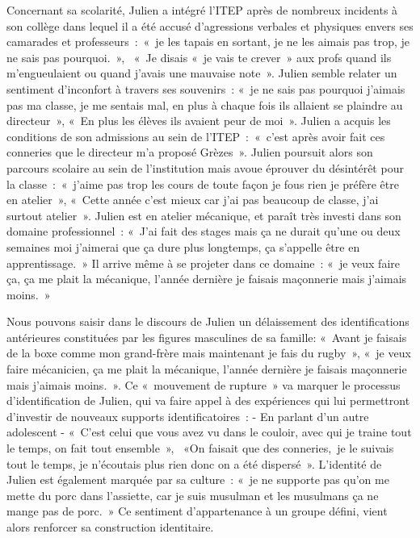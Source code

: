 \documentclass[12pt, a4paper]{book}
\begin{document}
\begin{spacing}{1.5}
Concernant sa scolarité, Julien a intégré l'ITEP après de nombreux incidents à son collège dans lequel il a été accusé d'agressions verbales et physiques envers ses camarades et professeurs : « je les tapais en sortant, je ne les aimais pas trop, je ne sais pas pourquoi. »,  « Je disais « je vais te crever » aux profs quand ils m'engueulaient ou quand j'avais une mauvaise note ». Julien semble relater un sentiment d'inconfort à travers ses souvenirs : « je ne sais pas pourquoi j'aimais pas ma classe, je me sentais mal, en plus à chaque fois ils allaient se plaindre au directeur », « En plus les élèves ils avaient peur de moi ». Julien a acquis les conditions de son admissions au sein de l'ITEP : « c'est après avoir fait ces conneries que le directeur m'a proposé Grèzes ». Julien poursuit alors son parcours scolaire au sein de l'institution mais avoue éprouver du désintérêt pour  la classe : « j'aime pas trop les cours de toute façon je fous rien je préfère être en atelier », « Cette année c'est mieux car j'ai pas beaucoup de classe, j'ai surtout atelier ». Julien est en atelier mécanique, et paraît très investi dans son domaine professionnel : « J'ai fait des stages mais ça ne durait qu'une ou deux semaines moi j'aimerai que ça dure plus longtemps, ça s'appelle être en apprentissage. » Il arrive même à se projeter dans ce domaine : « je veux faire ça, ça me plait la mécanique, l'année dernière je faisais maçonnerie mais j'aimais moins. »

Nous pouvons saisir dans le discours de Julien un délaissement des identifications antérieures constituées par les figures masculines de sa famille: « Avant je faisais de la boxe comme mon grand-frère mais maintenant je fais du rugby », « je veux faire mécanicien, ça me plait la mécanique, l'année dernière je faisais maçonnerie mais j'aimais moins. ». Ce « mouvement de rupture » va marquer le processus d'identification de Julien, qui va faire appel à des expériences qui lui permettront d'investir de nouveaux supports identificatoires : - En parlant d'un autre adolescent - « C'est celui que vous avez vu dans le couloir, avec qui je traine tout le temps, on fait tout ensemble »,  «On faisait que des conneries, je le suivais tout le temps, je n'écoutais plus rien donc on a été dispersé ». L'identité de Julien est également                                                                                                   marquée par sa culture : « je ne supporte pas qu'on me mette du porc dans l'assiette, car je suis musulman et les musulmans ça ne mange pas de porc. » Ce sentiment d'appartenance à un groupe défini, vient alors renforcer sa construction identitaire.


\end{spacing}
\end{document}
